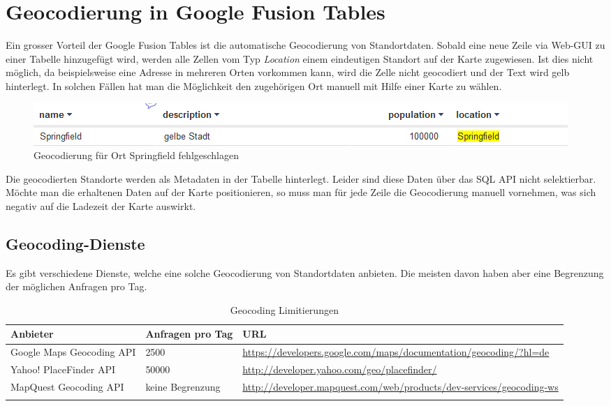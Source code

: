 \section{Geocodierung in Google Fusion Tables}
\label{gft-geocoding}
Ein grosser Vorteil der Google Fusion Tables ist die automatische 
\gls{Geocodierung} von Standortdaten. Sobald eine neue Zeile via Web-GUI zu einer Tabelle hinzugefügt wird, werden alle Zellen vom Typ \emph{Location} einem eindeutigen Standort auf der Karte zugewiesen. Ist dies nicht möglich, da beispielsweise eine Adresse in mehreren Orten vorkommen kann, wird die Zelle nicht geocodiert und der Text wird gelb hinterlegt. In solchen Fällen hat man die Möglichkeit den zugehörigen Ort manuell mit Hilfe einer Karte zu wählen.

\begin{figure}[!ht]
	\centering
	\includegraphics[width=\textwidth]{images/einfuehrung/geocoding_failed}
	\caption{Geocodierung für Ort Springfield fehlgeschlagen}
	\label{geocoding_failed}
\end{figure}

Die geocodierten Standorte werden als Metadaten in der Tabelle hinterlegt. Leider sind diese Daten über das SQL \gls{API} nicht selektierbar. Möchte man die erhaltenen Daten auf der Karte positionieren, so muss man für jede Zeile die \gls{Geocodierung} manuell vornehmen, was sich negativ auf die Ladezeit der Karte auswirkt.

\subsection{Geocoding-Dienste}
Es gibt verschiedene Dienste, welche eine solche \gls{Geocodierung} von Standortdaten anbieten. Die meisten davon haben aber eine Begrenzung der möglichen Anfragen pro Tag.

\begin{longtable}{|p{0.4\threecelltabwidth}|p{0.14\threecelltabwidth}|p{0.46\threecelltabwidth}|}
\hline 
\textbf{Anbieter} & \textbf{Anfragen pro Tag} & \textbf{URL} \\ 
\hline 
Google Maps Geocoding \gls{API} & 2500 & \url{https://developers.google.com/maps/documentation/geocoding/?hl=de} \\ 
\hline 
Yahoo! PlaceFinder \gls{API} & 50000 & \url{http://developer.yahoo.com/geo/placefinder/} \\ 
\hline 
MapQuest Geocoding \gls{API} & keine Begrenzung & \url{http://developer.mapquest.com/web/products/dev-services/geocoding-ws} \\ 
\hline 
\caption{Geocoding Limitierungen}
\end{longtable} 

